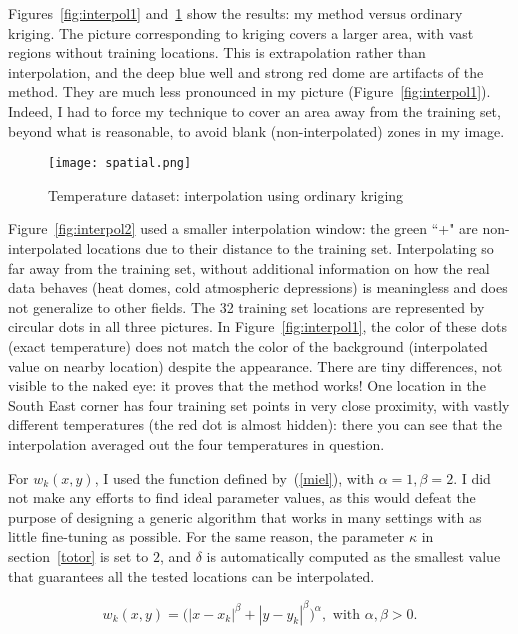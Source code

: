 \documentclass[oneside,10pt]{book}
\begin{document}
Figures~\ref{fig:interpol1} and~\ref{fig:spatial} show the results: my method versus ordinary kriging. The picture corresponding to
 kriging covers a larger area, with vast regions without training locations. This is extrapolation rather than interpolation, and the deep blue well and strong red dome are artifacts of the method. They are much less pronounced in my picture (Figure~\ref{fig:interpol1}). Indeed, I had to force my technique to cover an area away from the training set, beyond what is
reasonable, to avoid blank (non-interpolated) zones in my image.

\begin{figure}%
\centering
\texttt{[image: spatial.png]} %
\caption{Temperature dataset: interpolation using ordinary kriging}
\label{fig:spatial}
\end{figure}

Figure~\ref{fig:interpol2} used a smaller interpolation window: the green ``+" are non-interpolated locations due to their distance to the training set. Interpolating so far away from the training set, without additional information on how the real data behaves (heat domes, cold atmospheric depressions) is meaningless and does not generalize to other fields.  The 32 training set locations are represented by circular dots in all three pictures.  In Figure~\ref{fig:interpol1}, the color of these dots (exact temperature) does not match the color of the background (interpolated value on nearby location) despite the appearance. There are tiny differences, not visible to the naked eye: it proves that the method works! One location in the South East corner has four training set points in very close proximity, with vastly different temperatures (the red dot is almost hidden): there you can see that the interpolation averaged out the four temperatures in question.

For $w_k(x,y)$, I used the function defined by~(\ref{miel}), with $\alpha=1,\beta=2$. I did not make any efforts to find ideal parameter values, as this would defeat the purpose of designing a generic algorithm that works in many settings with as little fine-tuning as possible. For the same reason, the parameter $\kappa$ in section~\ref{totor} is set to $2$, and $\delta$ is automatically computed as the smallest value that guarantees all the tested locations can be interpolated.

\begin{equation}
w_k(x,y) = \Big(|x-x_k|^\beta + |y-y_k|^\beta\Big)^\alpha, \text{ with } \alpha,\beta > 0. \label{miel}
\end{equation}
\end{document}
